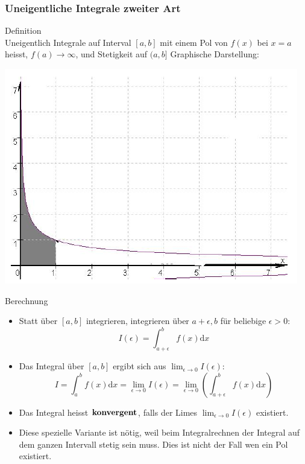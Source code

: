 \subsubsection{Uneigentliche Integrale zweiter Art}
	\begin{definition}{Definition}\\
		Uneigentlich Integrale auf Interval \([a,b]\) mit einem Pol von \(f(x)\) bei \(x=a\) heisst,
		\(f(a) \rightarrow \infty\), und Stetigkeit auf \((a,b]\)
		Graphische Darstellung:
	\begin{center}
		\includegraphics[width=0.4\linewidth]{images/Uneigentlicher_Integral_Beispiel2.png}
	\end{center}
  \end{definition}
  \begin{KR}{Berechnung}
	  \begin{itemize}
	  	
\item Statt über \([a,b]\) integrieren, integrieren über \(a+\epsilon,b\) für beliebige \(\epsilon>0\):
	\[I(\epsilon)=\int_{a+\epsilon}^b{f(x)\mathrm{d}x}\]
\item Das Integral über \([a,b]\) ergibt sich aus \(\lim_{\epsilon \rightarrow 0}I(\epsilon)\):
	\[I=\int_a^b{f(x)\mathrm{d}x}=\underset{\epsilon \rightarrow 0}{\lim}I(\epsilon)=\underset{\epsilon \rightarrow
	0}{\lim}\left(\int_{a+\epsilon}^b{f(x)\mathrm{d}x}\right) \]
\item Das Integral heisst \(\bold{konvergent}\), falls der Limes \(\lim_{\epsilon \rightarrow 0}I(\epsilon)\) existiert.
\item Diese spezielle Variante ist nötig, weil beim Integralrechnen der Integral auf dem ganzen Intervall stetig sein
	muss. Dies ist nicht der Fall wen ein Pol existiert.
\end{itemize}
  \end{KR}
